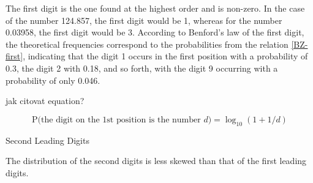 The first digit is the one found at the highest order and is non-zero. In the case of the number 124.857, the first digit would be 1, whereas for the number 0.03958, the first digit would be 3. According to Benford's law of the first digit, the theoretical frequencies correspond to the probabilities from the relation \ref{BZ-first}, indicating that the digit 1 occurs in the first position with a probability of 0.3, the digit 2 with 0.18, and so forth, with the digit 9 occurring with a probability of only 0.046.

\begin{koment}
jak citovat equation?
\end{koment}

\begin{equation}
\label{BZ-first}
\text{P(the digit on the 1st position is the number } d \text{)}= \log_{10}(1+1/d)
\end{equation}






\begin{koment}
Second Leading Digits    
\end{koment}


The distribution of the second digits is less skewed than that of the first leading digits.

